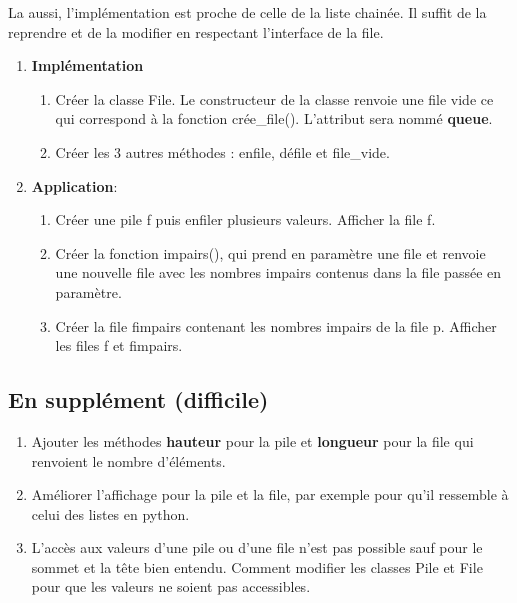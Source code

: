 \documentclass[11pt,a4paper]{article}
\begin{document}
La aussi, l'implémentation est proche de celle de la liste chainée. Il suffit de la reprendre et de la modifier en respectant l'interface de la file.

\begin{enumerate}
\item \textbf{Implémentation} 
\begin{enumerate}
\item Créer la classe File. Le constructeur de la classe renvoie une file vide ce qui correspond à la fonction crée\_file(). L'attribut sera nommé \textbf{queue}.
\item Créer les 3 autres méthodes : enfile, défile et file\_vide.
\end{enumerate}
\item \textbf{Application}:
\begin{enumerate}
\item Créer une pile f puis enfiler plusieurs valeurs. Afficher la file f.
\item Créer la fonction impairs(), qui prend en paramètre une file et renvoie une nouvelle file avec les nombres impairs contenus dans la file passée en paramètre.
\item Créer la file fimpairs contenant les nombres impairs de la file p. Afficher les files f et fimpairs.
\end{enumerate}
\end{enumerate}


\subsection{En supplément (difficile)}
\begin{enumerate}
\item Ajouter les méthodes \textbf{hauteur} pour la pile et \textbf{longueur} pour la file qui renvoient le nombre d'éléments.
\item Améliorer l'affichage pour la pile et la file, par exemple pour qu'il ressemble à celui des listes en python.
\item L'accès aux valeurs d'une pile ou d'une file n'est pas possible sauf pour le sommet et la tête bien entendu. Comment modifier les classes Pile et File pour que les valeurs ne soient pas accessibles.
\end{enumerate}
\end{document}
